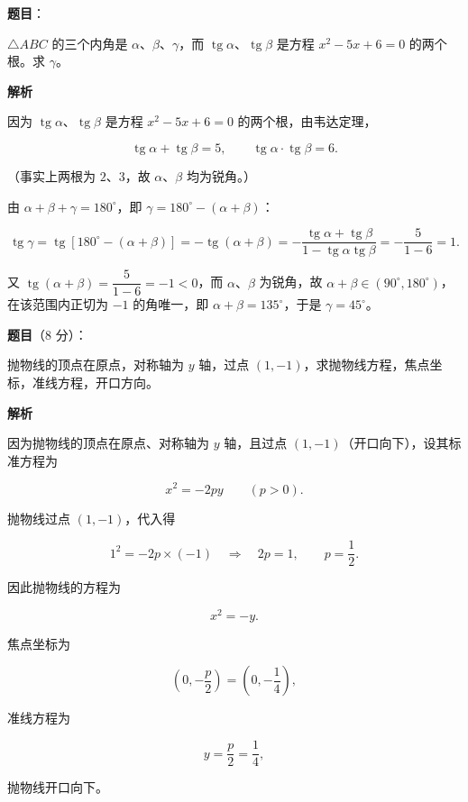 \begin{answer}

\textbf{题目}：

$\triangle ABC$ 的三个内角是 $\alpha\text{、}\beta\text{、}\gamma$，而 $\operatorname{tg}\alpha\text{、}\operatorname{tg}\beta$ 是方程 $x^2-5x+6=0$ 的两个根。求 $\gamma$。

\textbf{解析}

因为 $\operatorname{tg}\alpha\text{、}\operatorname{tg}\beta$ 是方程 $x^2-5x+6=0$ 的两个根，由韦达定理，

\nopagebreak[4]
\[
\operatorname{tg}\alpha+\operatorname{tg}\beta=5,\qquad
\operatorname{tg}\alpha\cdot\operatorname{tg}\beta=6.
\]

（事实上两根为 $2\text{、}3$，故 $\alpha\text{、}\beta$ 均为锐角。）

由 $\alpha+\beta+\gamma=180^\circ$，即 $\gamma=180^\circ-(\alpha+\beta)$：

\nopagebreak[4]
\[
\operatorname{tg}\gamma
=\operatorname{tg}\left[180^\circ-(\alpha+\beta)\right]
=-\operatorname{tg}(\alpha+\beta)
=-\frac{\operatorname{tg}\alpha+\operatorname{tg}\beta}
{1-\operatorname{tg}\alpha\operatorname{tg}\beta}
=-\frac{5}{1-6}=1.
\]

又 $\operatorname{tg}(\alpha+\beta)=\dfrac{5}{1-6}=-1<0$，而 $\alpha\text{、}\beta$ 为锐角，故 $\alpha+\beta\in(90^\circ,180^\circ)$，在该范围内正切为 $-1$ 的角唯一，即 $\alpha+\beta=135^\circ$，于是 $\gamma=45^\circ$。


\end{answer}
\begin{answer}

\textbf{题目}（8 分）：

抛物线的顶点在原点，对称轴为 $y$ 轴，过点 $(1,-1)$，求抛物线方程，焦点坐标，准线方程，开口方向。

\textbf{解析}

因为抛物线的顶点在原点、对称轴为 $y$ 轴，且过点 $(1,-1)$（开口向下），设其标准方程为

\nopagebreak[4]
\[
x^2=-2py\qquad(p>0).
\]

抛物线过点 $(1,-1)$，代入得

\nopagebreak[4]
\[
1^2=-2p\times(-1)
\quad\Longrightarrow\quad
2p=1,\qquad p=\frac12.
\]

因此抛物线的方程为

\nopagebreak[4]
\[
x^2=-y.
\]

焦点坐标为

\nopagebreak[4]
\[
\left(0,-\frac p2\right)=\left(0,-\frac14\right),
\]

准线方程为

\nopagebreak[4]
\[
y=\frac p2=\frac14,
\]

抛物线开口向下。


\end{answer}
